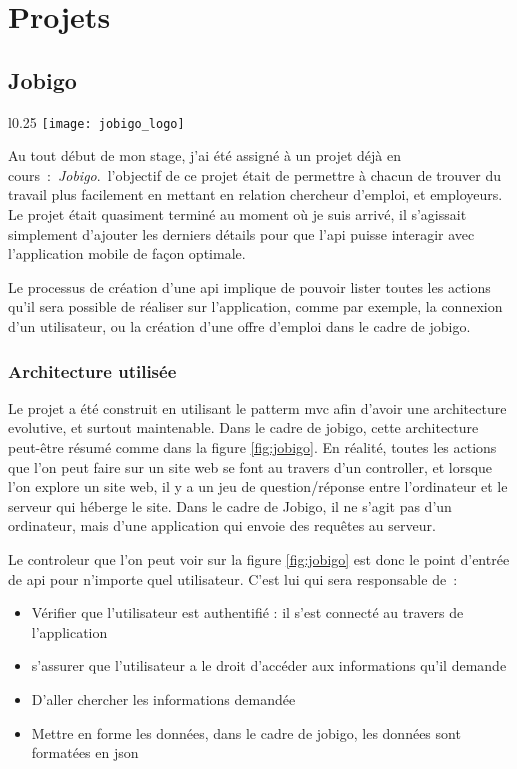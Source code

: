 \documentclass[rapport.tex]{subfiles}
\begin{document}
    \chapter{Projets}
        \section{Jobigo}\label{subsec:jobigo}
        \begin{wrapfigure}{l}{0.25\textwidth}
            \centering
            \texttt{[image: jobigo\_logo]}
        \end{wrapfigure}
        Au tout début de mon stage, j'ai été assigné à un projet déjà en cours~:~\emph{Jobigo}.\
        l'objectif de
        ce projet était de permettre à chacun de trouver du travail plus facilement
        en mettant en relation chercheur d'emploi, et employeurs.
        Le projet était quasiment terminé au moment où je suis arrivé, il s'agissait simplement d'ajouter
        les derniers détails pour que l'\gls{api} puisse interagir avec l'application mobile
        de façon optimale.

        Le processus de création d'une \gls{api} implique de pouvoir lister toutes les actions 
        qu'il sera possible de réaliser sur l'application, comme par exemple, la connexion d'un utilisateur, 
        ou la création d'une offre d'emploi dans le cadre de jobigo.


        \subsection{Architecture utilisée}
        Le projet a été construit en utilisant le patterm \gls{mvc}
        afin d'avoir une architecture evolutive, et surtout maintenable. Dans
        le cadre de jobigo, cette architecture peut-être résumé comme dans la
        figure \ref{fig:jobigo}.
        En réalité, toutes les actions que l'on peut faire sur un site web se
        font au travers d'un controller, et lorsque l'on explore un site web,
        il y a un jeu de question/réponse entre l'ordinateur et le serveur qui
        héberge le site. Dans le cadre de Jobigo, il ne s'agit pas d'un
        ordinateur, mais d'une application qui envoie des requêtes au serveur.

        Le controleur que l'on peut voir sur la figure \ref{fig:jobigo} est
        donc le point d'entrée de \gls{api} pour n'importe quel utilisateur.
        C'est lui qui sera responsable de~: 
        \begin{itemize}
            \item Vérifier que l'utilisateur est authentifié : il s'est connecté au travers de l'application
            \item s'assurer que l'utilisateur a le droit d'accéder aux informations qu'il demande
            \item D'aller chercher les informations demandée
            \item Mettre en forme les données, dans le cadre de jobigo, les données sont formatées en \gls{json}
        \end{itemize}
\end{document}
